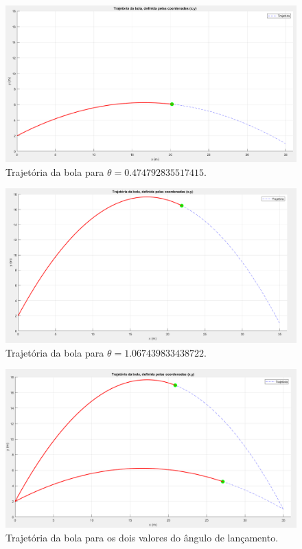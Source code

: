 \documentclass[12pt,a4paper]{article}
\begin{document}
\begin{figure}[H]
        \centering
        \includegraphics[width=12cm]{0.47479.png} 
        \caption{Trajetória da bola para $\theta=0.474792835517415$.}
        \label{fig:0.47479}
\end{figure}
\begin{figure}[H]
    \centering
    \includegraphics[width=12cm]{1.0674.png}
    \caption{Trajetória da bola para $\theta=1.067439833438722$.}
    \label{fig:1.0674}
\end{figure}
\begin{figure}[H]
    \centering
    \includegraphics[width=12cm]{comparacao.png}
    \caption{Trajetória da bola para os dois valores do ângulo de lançamento.}
    \label{fig:comparacao}
\end{figure} 

    
\end{document}

